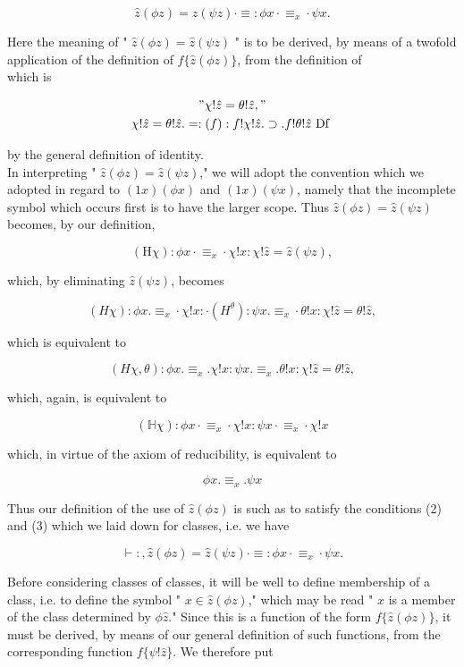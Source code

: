 \documentclass[10pt]{article}
\begin{document}
$$
\hat{z}(\phi z)=\hat{z}(\psi z) \cdot \equiv: \phi x \cdot \equiv_{x} \cdot \psi x .
$$

Here the meaning of " $\hat{z}(\phi z)=\hat{z}(\psi z)$ " is to be derived, by means of a twofold application of the definition of $f\{\hat{z}(\phi z)\}$, from the definition of\\
which is

$$
\begin{gathered}
" \chi!\hat{z}=\theta!\hat{z}, " \\
\chi!\hat{z}=\theta!\hat{z} .=:(f): f!\chi!\hat{z} . \supset . f!\theta!\hat{z} \text { Df }
\end{gathered}
$$

by the general definition of identity.\\
In interpreting " $\hat{z}(\phi z)=\hat{z}(\psi z)$," we will adopt the convention which we adopted in regard to $(1 x)(\phi x)$ and $(1 x)(\psi x)$, namely that the incomplete symbol which occurs first is to have the larger scope. Thus $\hat{z}(\phi z)=\hat{z}(\psi z)$ becomes, by our definition,

$$
(\mathrm{H} \chi): \phi x \cdot \equiv_{x} \cdot \chi!x: \chi!\hat{z}=\hat{z}(\psi z),
$$

which, by eliminating $\hat{z}(\psi z)$, becomes

$$
(H \chi): \phi x . \equiv_{x} \cdot \chi!x: \cdot\left(H^{\theta}\right): \psi x . \equiv_{x} \cdot \theta!x: \chi!\hat{z}=\theta!\hat{z},
$$

which is equivalent to

$$
(H \chi, \theta): \phi x . \equiv_{x} . \chi!x: \psi x . \equiv_{x} . \theta!x: \chi!\hat{z}=\theta!\hat{z},
$$

which, again, is equivalent to

$$
(\mathbb{H} \chi): \phi x \cdot \equiv_{x} \cdot \chi!x: \psi x \cdot \equiv_{x} \cdot \chi!x
$$

which, in virtue of the axiom of reducibility, is equivalent to

$$
\phi x . \equiv_{x} . \psi x
$$

Thus our definition of the use of $\hat{z}(\phi z)$ is such as to satisfy the conditions (2) and (3) which we laid down for classes, i.e. we have

$$
\vdash:, \hat{z}(\phi z)=\hat{z}(\psi z) \cdot \equiv: \phi x \cdot \equiv_{x} \cdot \psi x .
$$

Before considering classes of classes, it will be well to define membership of a class, i.e. to define the symbol " $x \in \hat{z}(\phi z)$," which may be read " $x$ is a member of the class determined by $\phi \hat{z}$." Since this is a function of the form $f\{\hat{z}(\phi z)\}$, it must be derived, by means of our general definition of such functions, from the corresponding function $f\{\psi!\hat{z}\}$. We therefore put
\end{document}

